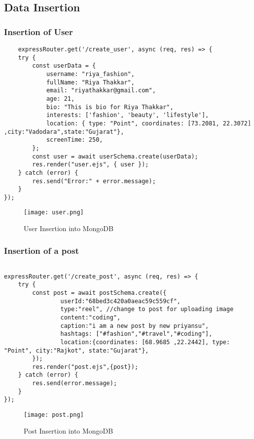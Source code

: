 \documentclass[12pt,a4paper]{article}
\begin{document}
\subsection{Data Insertion}
\subsubsection{Insertion of User}
\begin{lstlisting}
    expressRouter.get('/create_user', async (req, res) => {
    try {
        const userData = {
            username: "riya_fashion",
            fullName: "Riya Thakkar",
            email: "riyathakkar@gmail.com",
            age: 21,
            bio: "This is bio for Riya Thakkar",
            interests: ['fashion', 'beauty', 'lifestyle'],
            location: { type: "Point", coordinates: [73.2081, 22.3072] ,city:"Vadodara",state:"Gujarat"},
            screenTime: 250,
        };
        const user = await userSchema.create(userData);
        res.render("user.ejs", { user });
    } catch (error) {
        res.send("Error:" + error.message);
    }
});
\end{lstlisting}


\begin{figure}[h]
    \centering
    \texttt{[image: user.png]}
    \caption{User Insertion into MongoDB}
    \label{fig:sample}
\end{figure}


\subsubsection{Insertion of a post}
\begin{lstlisting}
    
expressRouter.get('/create_post', async (req, res) => {
    try {
        const post = await postSchema.create({
                userId:"68bed3c420a0aeac59c559cf",
                type:"reel", //change to post for uploading image 
                content:"coding",
                caption:"i am a new post by new priyansu",
                hashtags: ["#fashion","#travel","#coding"],
                location:{coordinates: [68.9685 ,22.2442], type: "Point", city:"Rajkot", state:"Gujarat"},
        });
        res.render("post.ejs",{post});
    } catch (error) {
        res.send(error.message);
    }
});
\end{lstlisting}


\begin{figure}[H]
    \centering
    \texttt{[image: post.png]}
    \caption{Post Insertion into MongoDB}
    \label{fig:sample}
\end{figure}
\end{document}
